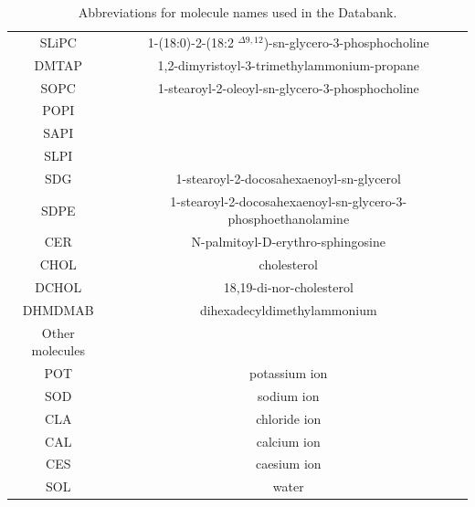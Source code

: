 \documentclass[fleqn,10pt]{wlscirepSI}
\begin{document}
\begin{table}[p]
\begin{tabular}{c c}
    SLiPC & 1-(18:0)-2-(18:2 $^{\Delta9,12}$)-sn-glycero-3-phosphocholine  \\
    DMTAP & 1,2-dimyristoyl-3-trimethylammonium-propane \\
    SOPC & 1-stearoyl-2-oleoyl-sn-glycero-3-phosphocholine \\
    POPI & \\ 
    SAPI & \\
    SLPI &  \\
    SDG & 1-stearoyl-2-docosahexaenoyl-sn-glycerol \\
    SDPE & 1-stearoyl-2-docosahexaenoyl-sn-glycero-3-phosphoethanolamine \\
    CER  & N-palmitoyl-D-erythro-sphingosine \\
    CHOL & cholesterol  \\
    DCHOL & 18,19-di-nor-cholesterol \\
    DHMDMAB & dihexadecyldimethylammonium  \\
    \hline
    Other molecules & \\
    \hline
    POT & potassium ion  \\
    SOD & sodium ion  \\
    CLA & chloride ion \\
    CAL & calcium ion  \\
    CES & caesium ion \\
    SOL & water  \\
    \end{tabular}
    \caption{Abbreviations for molecule names used in the Databank.}
    \label{tab:abbreviations}
\end{table}
\end{document}
